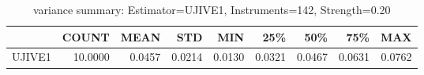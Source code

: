 \begin{table}[ht]
\centering
\caption{variance summary: Estimator=UJIVE1, Instruments=142, Strength=0.20}
\begin{tabular}{lrrrrrrrr}
\toprule
 & COUNT & MEAN & STD & MIN & 25\% & 50\% & 75\% & MAX \\
\midrule
UJIVE1 & 10.0000 & 0.0457 & 0.0214 & 0.0130 & 0.0321 & 0.0467 & 0.0631 & 0.0762 \\
\bottomrule
\end{tabular}
\end{table}
